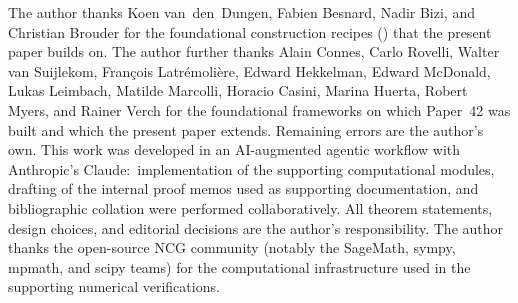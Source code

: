 \documentclass[11pt,a4paper]{article}
\theoremstyle{plain}
\theoremstyle{definition}
\begin{document}
The author thanks Koen van~den~Dungen, Fabien Besnard, Nadir Bizi, and
Christian Brouder for the foundational construction recipes
(\cite{vandungen2016, bizi_brouder_besnard2018}) that the present
paper builds on. The author further thanks
Alain Connes, Carlo Rovelli, Walter van Suijlekom, Fran\c{c}ois
Latr\'emoli\`ere, Edward Hekkelman, Edward McDonald, Lukas Leimbach,
Matilde Marcolli, Horacio Casini, Marina Huerta, Robert Myers, and
Rainer Verch for the foundational frameworks on which Paper~42 was
built and which the present paper extends. Remaining errors are the
author's own. This work was developed in an AI-augmented agentic
workflow with Anthropic's Claude:\ implementation of the supporting
computational modules, drafting of the internal proof memos used as
supporting documentation, and bibliographic collation were performed
collaboratively. All theorem statements, design choices, and
editorial decisions are the author's responsibility. The author
thanks the open-source NCG community (notably the SageMath, sympy,
mpmath, and scipy teams) for the computational infrastructure used in
the supporting numerical verifications.
\end{document}
